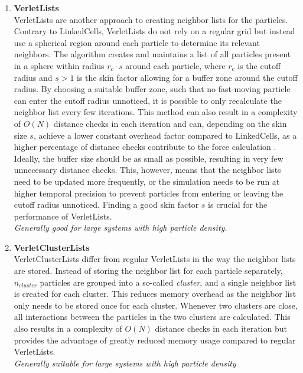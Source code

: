 \begin{enumerate}[label=\textbf{\arabic*.}]
\begin{enumerate}
                  \item \textbf{VerletLists} \\
                        VerletLists are another approach to creating neighbor lists for the particles. Contrary to LinkedCells, VerletLists do not rely on a regular grid but instead use a spherical region around each particle to determine its relevant neighbors. The algorithm creates and maintains a list of all particles present in a sphere within radius $r_c \cdot s$ around each particle, where $r_c$ is the cutoff radius and $s>1$ is the skin factor allowing for a buffer zone around the cutoff radius.
                        By choosing a suitable buffer zone, such that no fast-moving particle can enter the cutoff radius unnoticed, it is possible to only recalculate the neighbor list every few iterations. This method can also result in a complexity of $O(N)$ distance checks in each iteration and can, depending on the skin size $s$, achieve a lower constant overhead factor compared to LinkedCells, as a higher percentage of distance checks contribute to the force calculation \cite{GRATL2019748}. Ideally, the buffer size should be as small as possible, resulting in very few unnecessary distance checks. This, however, means that the neighbor lists need to be updated more frequently, or the simulation needs to be run at higher temporal precision to prevent particles from entering or leaving the cutoff radius unnoticed. Finding a good skin factor $s$ is crucial for the performance of VerletLists.\\
                        \textit{Generally good for large systems with high particle density.}

                  \item \textbf{VerletClusterLists} \\
                        VerletClusterLists differ from regular VerletLists in the way the neighbor lists are stored. Instead of storing the neighbor list for each particle separately, $n_{cluster}$ particles are grouped into a so-called \emph{cluster}, and a single neighbor list is created for each cluster. This reduces memory overhead as the neighbor list only needs to be stored once for each cluster. Whenever two clusters are close, all interactions between the particles in the two clusters are calculated. This also results in a complexity of $O(N)$ distance checks in each iteration but provides the advantage of greatly reduced memory usage compared to regular VerletLists.\\
                        \textit{Generally suitable for large systems with high particle density}


\end{enumerate}
\end{enumerate}
